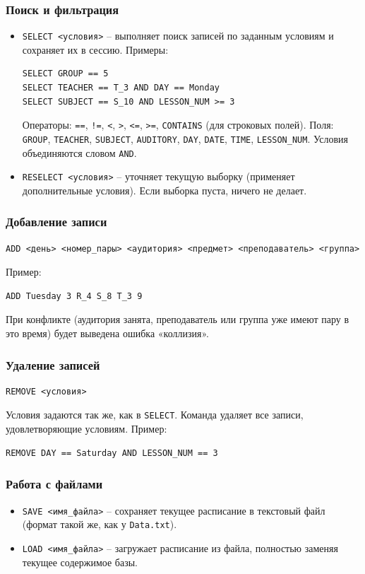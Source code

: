 \documentclass[12pt,a4paper]{article}
\begin{document}
\subsubsection{Поиск и фильтрация}
\begin{itemize}
  \item \texttt{SELECT <условия>} – выполняет поиск записей по заданным условиям и сохраняет их в сессию. Примеры:
  \begin{lstlisting}
SELECT GROUP == 5
SELECT TEACHER == T_3 AND DAY == Monday
SELECT SUBJECT == S_10 AND LESSON_NUM >= 3
  \end{lstlisting}
  Операторы: \texttt{==}, \texttt{!=}, \texttt{<}, \texttt{>}, \texttt{<=}, \texttt{>=}, \texttt{CONTAINS} (для строковых полей). Поля: \texttt{GROUP}, \texttt{TEACHER}, \texttt{SUBJECT}, \texttt{AUDITORY}, \texttt{DAY}, \texttt{DATE}, \texttt{TIME}, \texttt{LESSON\_NUM}. Условия объединяются словом \texttt{AND}.
  \item \texttt{RESELECT <условия>} – уточняет текущую выборку (применяет дополнительные условия). Если выборка пуста, ничего не делает.
\end{itemize}

\subsubsection{Добавление записи}
\begin{lstlisting}
ADD <день> <номер_пары> <аудитория> <предмет> <преподаватель> <группа>
\end{lstlisting}
Пример:
\begin{lstlisting}
ADD Tuesday 3 R_4 S_8 T_3 9
\end{lstlisting}
При конфликте (аудитория занята, преподаватель или группа уже имеют пару в это время) будет выведена ошибка «коллизия».

\subsubsection{Удаление записей}
\begin{lstlisting}
REMOVE <условия>
\end{lstlisting}
Условия задаются так же, как в \texttt{SELECT}. Команда удаляет все записи, удовлетворяющие условиям. Пример:
\begin{lstlisting}
REMOVE DAY == Saturday AND LESSON_NUM == 3
\end{lstlisting}

\subsubsection{Работа с файлами}
\begin{itemize}
  \item \texttt{SAVE <имя\_файла>} – сохраняет текущее расписание в текстовый файл (формат такой же, как у \texttt{Data.txt}).
  \item \texttt{LOAD <имя\_файла>} – загружает расписание из файла, полностью заменяя текущее содержимое базы.
\end{itemize}
\end{document}
